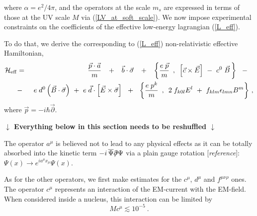 \documentclass[12pt]{revtex4}
\newcommand{\slashed}[1]{\hbox{{$#1$}\llap{$/$}}}
\begin{document}
        where $ \alpha = e^2/4\pi $,
and the operators at the scale $ m_s $ are expressed
in terms of those at the UV scale $ M $ via
(\ref{LV_at_soft_scale}).
We now impose experimental constraints on the
coefficients of the effective low-energy lagrangian
(\ref{L_eff}).

To do that, we derive the corresponding to (\ref{L_eff}) non-relativistic
effective Hamiltonian,
\begin{eqnarray}
\label{H_eff}
	\mathcal{H}_{\rm eff} 
	& = &
	~~
	\frac{\vec{p} \cdot \vec{a}}
                  {m}
	~~\,+~~\,
	\vec{b} \cdot \vec{\sigma}
	~~\,+~~\,
	\biggl\{
		\frac{e\; \vec{p}}
                    {m}
		\,~,~\,
		\left[ \vec{c} \times \vec{E} \right]
		~-~
		c^0\; \vec{B}
		\,
	\biggr\}
	~~\,-~~\,
	\\
\nonumber
	& - &
	~
	e \; d^0 \left( \vec{B} \cdot \vec{\sigma} \right)
	~+~
	e\; \vec{d} \cdot
	\left[ \vec{E} \times \vec{\sigma} \right]
	~~+~~	
	\biggl\{
		\frac{e\; p^k}
                    {m}
		\,~,~\,
		2\; f_{k0l} E^l 
		~+~
		f_{klm} \epsilon_{lmn}
		B^m
	\biggr\}~,
\end{eqnarray}
	where $ \vec{p} = - i \hbar \vec{\partial} $.

\begin{center}
{\bf
	$\downarrow$ Everything below in this section needs to be reshuffled
	$\downarrow$
}
\end{center}

The operator $ a^\mu $ is believed not to lead to
any physical effects as it can be totally absorbed into
the kinetic term 
$ - i\, \overline{\Psi}\slashed{\partial}\Psi $
via a plain gauge rotation [{\it reference}]:
$ \Psi(x) \to e^{i a^\mu x_\mu} \Psi(x) $.

As for the other operators, we first make estimates for the 
$ c^\mu $, $ d^\mu $ and $ f^{\mu\nu\rho} $ ones.
The operator $ c^\mu $ represents an interaction of
the EM-current with the EM-field.
When considered inside a nucleus, this interaction
can be limited 
\cite{GrootNibbelink:2004za}
by 
\[
	M c^\mu \lesssim 10^{-5}~.
\]
\end{document}
